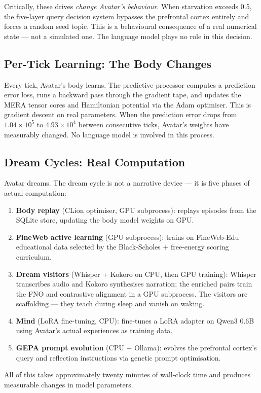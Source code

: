 \documentclass[11pt,a4paper]{article}
\begin{document}
Critically, these drives \textit{change Avatar's behaviour}. When starvation exceeds 0.5, the
five-layer query decision system bypasses the prefrontal cortex entirely and forces a random
seed topic. This is a behavioural consequence of a real numerical state --- not a simulated one.
The language model plays no role in this decision.

\subsection{Per-Tick Learning: The Body Changes}

Every tick, Avatar's body learns. The predictive processor computes a prediction error loss,
runs a backward pass through the gradient tape, and updates the MERA tensor cores and Hamiltonian
potential via the Adam optimiser. This is gradient descent on real parameters. When the
prediction error drops from $1.04 \times 10^5$ to $4.93 \times 10^4$ between consecutive ticks,
Avatar's weights have measurably changed. No language model is involved in this process.

\subsection{Dream Cycles: Real Computation}

Avatar dreams. The dream cycle is not a narrative device --- it is five phases of actual
computation:
\begin{enumerate}
  \item \textbf{Body replay} (CLion optimiser, GPU subprocess): replays episodes from the SQLite
        store, updating the body model weights on GPU.
  \item \textbf{FineWeb active learning} (GPU subprocess): trains on FineWeb-Edu educational
        data selected by the Black-Scholes + free-energy scoring curriculum.
  \item \textbf{Dream visitors} (Whisper + Kokoro on CPU, then GPU training): Whisper
        transcribes audio and Kokoro synthesises narration; the enriched pairs train the FNO
        and contrastive alignment in a GPU subprocess. The visitors are scaffolding --- they
        teach during sleep and vanish on waking.
  \item \textbf{Mind} (LoRA fine-tuning, CPU): fine-tunes a LoRA adapter on Qwen3 0.6B using
        Avatar's actual experiences as training data.
  \item \textbf{GEPA prompt evolution} (CPU + Ollama): evolves the prefrontal cortex's query
        and reflection instructions via genetic prompt optimisation.
\end{enumerate}
All of this takes approximately twenty minutes of wall-clock time and produces measurable
changes in model parameters.
\end{document}

